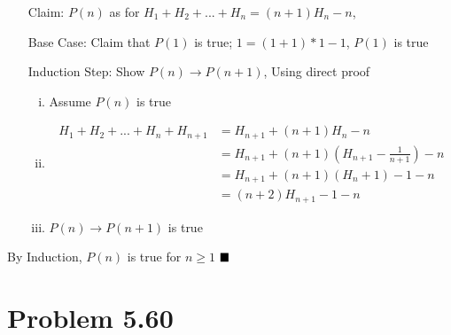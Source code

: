\documentclass{article}
\def\math#1{$#1$}
\begin{document}
\begin{itemize}
    \item [Claim: ] \math{P(n)} as for \math{H_1 + H_2 + ... + H_n = (n+1)H_n-n}, 
    \item [Base Case: ] Claim that \math{P(1)} is true; \math{1 = (1+1)*1-1}, \math{P(1)} is true
    \item [Induction Step: ] Show \math{P(n) \to P(n+1)}, Using direct proof 
        \begin{enumerate}[i)]
            \item Assume \math{P(n)} is true
            \item \begin{equation}
                    \begin{split}
                                H_1 + H_2 + ... + H_n + H_{n+1} & = H_{n+1} + (n+1)H_n-n      \\
                                & = H_{n+1} + (n+1)(H_{n+1} - \frac{1}{n+1}) - n \\
                                & = H_{n+1} + (n+1)(H_n+1) - 1 - n \\
                                & = (n+2) H_{n+1} - 1 - n
                        \end{split}
                \end{equation}
            \item \math{P(n) \to P(n+1)} is true
        \end{enumerate} 
\end{itemize}

By Induction, \math{P(n)} is true for \math{n \geq 1} \math{\hfill{\blacksquare}}

\section{Problem 5.60}
\end{document}
